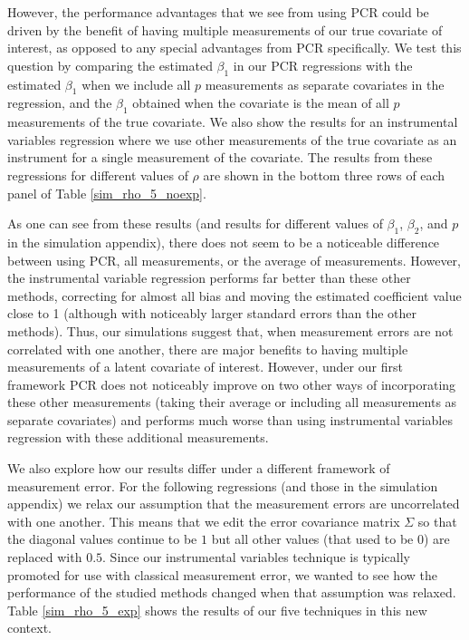 \documentclass[10pt]{article}
\begin{document}
        However, the performance advantages that we see from using PCR could be driven by the benefit of having multiple measurements of our true covariate of interest, as opposed to any special advantages from PCR specifically. We test this question by comparing the estimated $\beta_1$ in our PCR regressions with the estimated $\beta_1$ when we include all $p$ measurements as separate covariates in the regression, and the $\beta_1$ obtained when the covariate is the mean of all $p$ measurements of the true covariate. We also show the results for an instrumental variables regression where we use other measurements of the true covariate as an instrument for a single measurement of the covariate. The results from these regressions for different values of $\rho$ are shown in the bottom three rows of each panel of Table \ref{sim_rho_5_noexp}.

        As one can see from these results (and results for different values of $\beta_1$, $\beta_2$, and $p$ in the simulation appendix), there does not seem to be a noticeable difference between using PCR, all measurements, or the average of measurements. However, the instrumental variable regression performs far better than these other methods, correcting for almost all bias and moving the estimated coefficient value close to 1 (although with noticeably larger standard errors than the other methods). Thus, our simulations suggest that, when measurement errors are not correlated with one another, there are major benefits to having multiple measurements of a latent covariate of interest. However, under our first framework PCR does not noticeably improve on two other ways of incorporating these other measurements (taking their average or including all measurements as separate covariates) and performs much worse than using instrumental variables regression with these additional measurements.

        We also explore how our results differ under a different framework of measurement error. For the following regressions (and those in the simulation appendix) we relax our assumption that the measurement errors are uncorrelated with one another. This means that we edit the error covariance matrix $\Sigma$ so that the diagonal values continue to be $1$ but all other values (that used to be $0$) are replaced with $0.5$. Since our instrumental variables technique is typically promoted for use with classical measurement error, we wanted to see how the performance of the studied methods changed when that assumption was relaxed. Table \ref{sim_rho_5_exp} shows the results of our five techniques in this new context.
\end{document}
